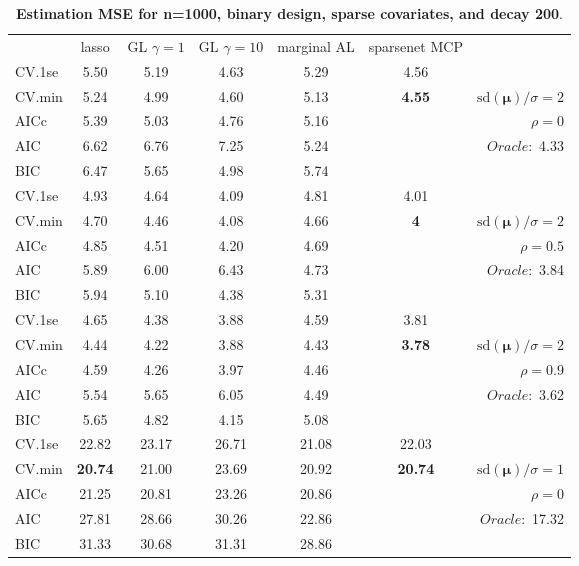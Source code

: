 \clearpage
\begin{table}\vspace{-.5cm}
\caption[l]{ { \bf Estimation MSE for n=1000, binary design, 
sparse covariates, and  decay  200}.}
\vspace{-.5cm}
\footnotesize{}
\begin{center}
\begin{tabular}{l*{5}{c}|r}
& lasso & GL $\gamma=1$ & GL $\gamma=10$ & marginal AL & sparsenet MCP  & \\
 \cline{1-7}
CV.1se & 5.50 & 5.19 & 4.63 & 5.29 & 4.56 & \\
CV.min & 5.24 & 4.99 & 4.60 & 5.13 & {\bf 4.55} &  $\mathrm{sd}(\mathbf{\mu})/\sigma=2$ \\
AICc & 5.39 & 5.03 & 4.76 & 5.16 & & $\rho=0$ \\
AIC & 6.62 & 6.76 & 7.25 & 5.24 & &  \multirow{2}{*}{$Oracle: $ 4.33} \\
BIC & 6.47 & 5.65 & 4.98 & 5.74 & &  \\
 \hline 
CV.1se & 4.93 & 4.64 & 4.09 & 4.81 & 4.01 & \\
CV.min & 4.70 & 4.46 & 4.08 & 4.66 & {\bf 4} &  $\mathrm{sd}(\mathbf{\mu})/\sigma=2$ \\
AICc & 4.85 & 4.51 & 4.20 & 4.69 & & $\rho=0.5$ \\
AIC & 5.89 & 6.00 & 6.43 & 4.73 & &  \multirow{2}{*}{$Oracle: $ 3.84} \\
BIC & 5.94 & 5.10 & 4.38 & 5.31 & &  \\
 \hline 
CV.1se & 4.65 & 4.38 & 3.88 & 4.59 & 3.81 & \\
CV.min & 4.44 & 4.22 & 3.88 & 4.43 & {\bf 3.78} &  $\mathrm{sd}(\mathbf{\mu})/\sigma=2$ \\
AICc & 4.59 & 4.26 & 3.97 & 4.46 & & $\rho=0.9$ \\
AIC & 5.54 & 5.65 & 6.05 & 4.49 & &  \multirow{2}{*}{$Oracle: $ 3.62} \\
BIC & 5.65 & 4.82 & 4.15 & 5.08 & &  \\
 \hline 
CV.1se & 22.82 & 23.17 & 26.71 & 21.08 & 22.03 & \\
CV.min & {\bf 20.74} & 21.00 & 23.69 & 20.92 & {\bf 20.74} &  $\mathrm{sd}(\mathbf{\mu})/\sigma=1$ \\
AICc & 21.25 & 20.81 & 23.26 & 20.86 & & $\rho=0$ \\
AIC & 27.81 & 28.66 & 30.26 & 22.86 & &  \multirow{2}{*}{$Oracle: $ 17.32} \\
BIC & 31.33 & 30.68 & 31.31 & 28.86 & &  \\

\end{tabular}
\end{center}
\end{table}
